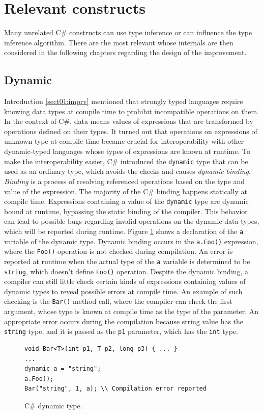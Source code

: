 \section{Relevant constructs}

Many unrelated C\# constructs can use type inference or can influence the type inference algorithm.
There are the most relevant whose internals are then considered in the following chapters regarding the design of the improvement.

\subsection*{Dynamic}

Introduction \ref{sect01:imprv} mentioned that strongly typed languages require knowing data types at compile time to prohibit incompatible operations on them. 
In the context of C\#, data means values of expressions that are transformed by operations defined on their types. 
It turned out that operations on expressions of unknown type at compile time became crucial for interoperability with other dynamic-typed languages whose types of expressions are known at runtime. 
To make the interoperability easier, C\# introduced the \texttt{dynamic} type that can be used as an ordinary type, which avoids the checks and causes \textit{dynamic binding}. 
\textit{Binding} is a process of resolving referenced operations based on the type and value of the expression. 
The majority of the C\# binding happens statically at compile time. Expressions containing a value of the \texttt{dynamic} type are dynamic bound at runtime, bypassing the static binding of the compiler. 
This behavior can lead to possible bugs regarding invalid operations on the dynamic data types, which will be reported during runtime. 
Figure \ref{img06:dynamic} shows a declaration of the \texttt{a} variable of the dynamic type.
Dynamic binding occurs in the \texttt{a.Foo()} expression, where the \texttt{Foo()} operation is not checked during compilation. 
An error is reported at runtime when the actual type of the \texttt{a} variable is determined to be \texttt{string}, which doesn’t define \texttt{Foo()} operation. Despite the dynamic binding, a compiler can still little check certain kinds of expressions containing values of dynamic types to reveal possible errors at compile time. 
An example of such checking is the \texttt{Bar()} method call, where the compiler can check the first argument, whose type is known at compile time as the type of the parameter. 
An appropriate error occurs during the compilation because string value has the \texttt{string} type, and it is passed as the \texttt{p1} parameter, which has the \texttt{int} type.
\begin{figure}[h]
\begin{lstlisting}[style=csharp]
void Bar<T>(int p1, T p2, long p3) { ... }
...
dynamic a = "string";
a.Foo();
Bar("string", 1, a); \\ Compilation error reported
\end{lstlisting}
\caption{C\# dynamic type.}
\label{img06:dynamic}
\end{figure}

